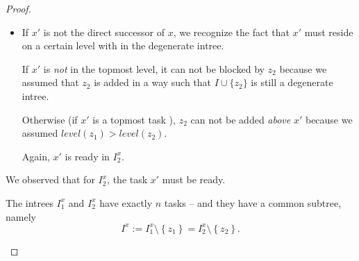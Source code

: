 \begin{proof}
\begin{itemize}
\begin{itemize}
    \item If $x'$ is not the direct successor of $x$, we recognize the fact that $x'$ must reside on a certain level with in the degenerate intree. 

      If $x'$ is \emph{not} in the topmost level, it can not be blocked by $z_2$ because we assumed that $z_2$ is added in a way such that $I\cup\{z_2\}$ is still a degenerate intree.

      Otherwise (if $x'$ is a topmost task ), $z_2$ can not be added \emph{above} $x'$ because we assumed $level(z_1)>level(z_2)$.

      Again, $x'$ is ready in $I_2^x$.

    \end{itemize}
    We observed that for $I_2^x$, the task $x'$ must be ready.
    
    The intrees $I^x_{1}$ and $I^x_{2}$ have exactly $n$ tasks -- and they have a common subtree, namely
    \begin{equation*}
      I^x := I^x_{1}\setminus\left\{ z_1 \right\}=I^x_{2}\setminus\left\{ z_2 \right\}.
    \end{equation*}


\end{itemize}
\end{proof}
